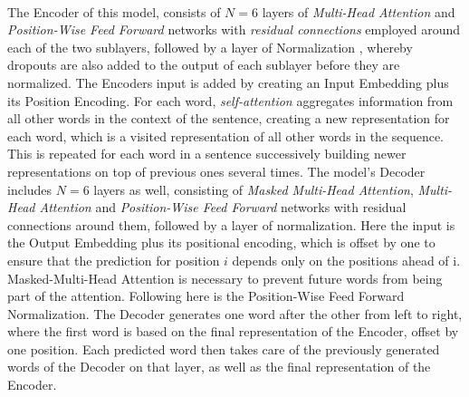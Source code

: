\documentclass[a4paper, 11pt,titlepage,oneside,openany]{book}
\begin{document}
\\The Encoder of this model, consists of $N=6$ layers of \textit{Multi-Head Attention} and \textit{Position-Wise Feed Forward} networks with \textit{residual connections} \cite{residualcon} employed around each of the two sublayers, followed by a layer of Normalization \cite{normalization}, whereby dropouts \cite{dopout} are also added to the output of each sublayer before they are normalized. The Encoders input is added by creating an Input Embedding plus its Position Encoding. For each word, \textit{self-attention} aggregates information from all other words in the context of the sentence, creating a new representation for each word, which is a visited representation of all other words in the sequence. This is repeated for each word in a sentence  successively building newer representations on top of previous ones several times.
\noindent The model's Decoder includes $N=6$ layers as well, consisting of \textit{Masked Multi-Head Attention}, \textit{Multi-Head Attention} and \textit{Position-Wise Feed Forward} networks with residual connections around them, followed by a layer of normalization. Here the input is the Output Embedding plus its positional encoding, which is offset by one to ensure that the prediction for position $i$ depends only on the positions ahead of i. Masked-Multi-Head Attention is necessary to prevent future words from being part of the attention. Following here is the Position-Wise Feed Forward Normalization. The Decoder generates one word after the other from left to right, where the first word is based on the final representation of the Encoder, offset by one position. Each predicted word then takes care of the previously generated words of the Decoder on that layer, as well as the final representation of the Encoder.
\end{document}
